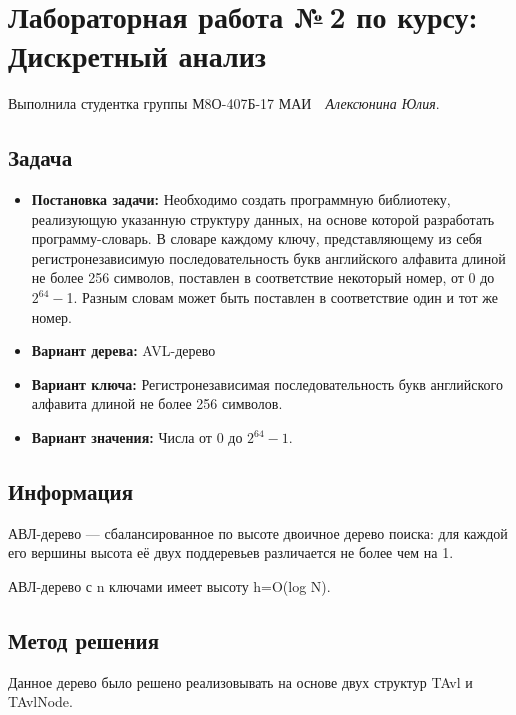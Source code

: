\documentclass[12pt]{article}
\begin{document}
\section*{\centering Лабораторная работа №\,2 по курсу:\\ Дискретный анализ}

Выполнила студентка группы М8О-407Б-17 МАИ \,\, \textit{Алексюнина Юлия}.

\subsection*{Задача}
\begin{itemize}
\item {\bf Постановка задачи:}\subitem 
Необходимо создать программную библиотеку, реализующую указанную структуру данных, на основе которой разработать программу-словарь. В словаре каждому ключу, представляющему из себя регистронезависимую последовательность букв английского алфавита длиной не более 256 символов, поставлен в соответствие некоторый номер, от 0 до $2^{64} - $1. Разным словам может быть поставлен в соответствие один и тот же номер.
\\
\item {\bf Вариант дерева: }\subitem  AVL-дерево

\item{ \bf Вариант ключа:} \subitem Регистронезависимая последовательность букв английского алфавита длиной не более 256 символов.


\item {\bf Вариант значения:} \subitem   Числа от $0$ до $2^{64} − 1$.

\end{itemize}

\subsection*{Информация}

АВЛ-дерево — сбалансированное по высоте двоичное дерево поиска: для каждой его вершины высота её двух поддеревьев различается не более чем на 1.

АВЛ-дерево с n ключами имеет высоту h=O(log N).

\subsection*{Метод решения}

Данное дерево было решено реализовывать на основе двух структур TAvl и TAvlNode.
\end{document}
